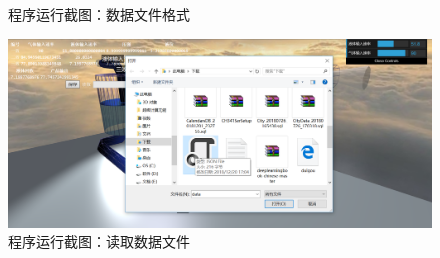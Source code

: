 \documentclass[a4paper]{ctexart}
\begin{document}
\begin{spacing}{1.25}
\begin{figure}[htbp]
	\caption{程序运行截图：数据文件格式}
\end{figure}
\begin{figure}[htbp]
	\centering
	\includegraphics [width=\textwidth]{figure//res7.png}
	\caption{程序运行截图：读取数据文件}
\end{figure}
\end{spacing}
\end{document}
